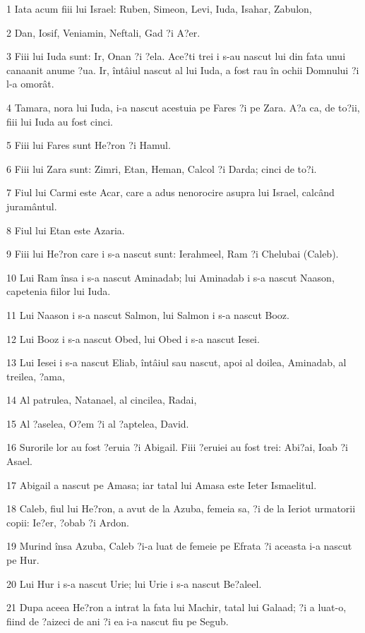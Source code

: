 \par 1 Iata acum fiii lui Israel: Ruben, Simeon, Levi, Iuda, Isahar, Zabulon,
\par 2 Dan, Iosif, Veniamin, Neftali, Gad ?i A?er.
\par 3 Fiii lui Iuda sunt: Ir, Onan ?i ?ela. Ace?ti trei i s-au nascut lui din fata unui canaanit anume ?ua. Ir, întâiul nascut al lui Iuda, a fost rau în ochii Domnului ?i l-a omorât.
\par 4 Tamara, nora lui Iuda, i-a nascut acestuia pe Fares ?i pe Zara. A?a ca, de to?ii, fiii lui Iuda au fost cinci.
\par 5 Fiii lui Fares sunt He?ron ?i Hamul.
\par 6 Fiii lui Zara sunt: Zimri, Etan, Heman, Calcol ?i Darda; cinci de to?i.
\par 7 Fiul lui Carmi este Acar, care a adus nenorocire asupra lui Israel, calcând juramântul.
\par 8 Fiul lui Etan este Azaria.
\par 9 Fiii lui He?ron care i s-a nascut sunt: Ierahmeel, Ram ?i Chelubai (Caleb).
\par 10 Lui Ram însa i s-a nascut Aminadab; lui Aminadab i s-a nascut Naason, capetenia fiilor lui Iuda.
\par 11 Lui Naason i s-a nascut Salmon, lui Salmon i s-a nascut Booz.
\par 12 Lui Booz i s-a nascut Obed, lui Obed i s-a nascut Iesei.
\par 13 Lui Iesei i s-a nascut Eliab, întâiul sau nascut, apoi al doilea, Aminadab, al treilea, ?ama,
\par 14 Al patrulea, Natanael, al cincilea, Radai,
\par 15 Al ?aselea, O?em ?i al ?aptelea, David.
\par 16 Surorile lor au fost ?eruia ?i Abigail. Fiii ?eruiei au fost trei: Abi?ai, Ioab ?i Asael.
\par 17 Abigail a nascut pe Amasa; iar tatal lui Amasa este Ieter Ismaelitul.
\par 18 Caleb, fiul lui He?ron, a avut de la Azuba, femeia sa, ?i de la Ieriot urmatorii copii: Ie?er, ?obab ?i Ardon.
\par 19 Murind însa Azuba, Caleb ?i-a luat de femeie pe Efrata ?i aceasta i-a nascut pe Hur.
\par 20 Lui Hur i s-a nascut Urie; lui Urie i s-a nascut Be?aleel.
\par 21 Dupa aceea He?ron a intrat la fata lui Machir, tatal lui Galaad; ?i a luat-o, fiind de ?aizeci de ani ?i ea i-a nascut fiu pe Segub.
